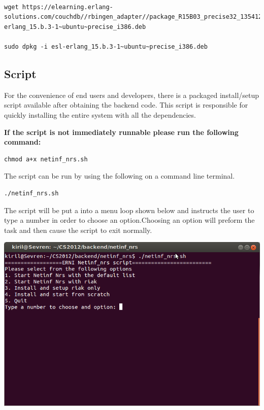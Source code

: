 \begin{verbatim}

wget https://elearning.erlang-solutions.com/couchdb//rbingen_adapter//package_R15B03_precise32_1354121173/esl-erlang_15.b.3-1~ubuntu~precise_i386.deb
 
sudo dpkg -i esl-erlang_15.b.3-1~ubuntu~precise_i386.deb

\end{verbatim}

\subsection{Script}
\label{backend-install-script}
For the convenience of end users and developers, there is a packaged install/setup script available after obtaining the backend code. This script is responsible for quickly installing the entire system with all the dependencies.

\textbf{If the script is not immediately runnable please run the following command:}
\begin{verbatim}
chmod a+x netinf_nrs.sh
\end{verbatim}

The script can be run by using the following on a command line terminal.

\begin{verbatim}
./netinf_nrs.sh
\end{verbatim}

The script will be put a into a menu loop shown below and instructs the user to type a number in order to choose an option.Choosing an option will preform the task and then cause the script to exit normally.

\includegraphics[scale=0.5]{./img/Backend_install_script.png}

